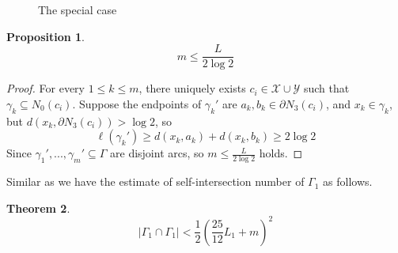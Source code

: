\documentclass[11pt, a4paper]{article}
\newtheorem{thm}{Theorem}[section]
\newtheorem{prop}[thm]{Proposition}
\theoremstyle{definition}
\theoremstyle{remark}
\newcommand{\calx}{\mathcal{X}}
\newcommand{\caly}{\mathcal{Y}}
\newcommand{\abs}[1]{\left| #1 \right|}
\newcommand{\bracket}[1]{\left( #1 \right)}
\begin{document}
\begin{enumerate}
\begin{figure}[htbp]

\caption{\label{fig:special_case}
The special case}
\end{figure}





\end{enumerate}









\begin{prop}
 $$m\leqslant\frac{L}{2\log2}$$
\end{prop}
\begin{proof}
For every $1\leqslant k\leqslant m$, there uniquely exists $c_i\in\calx\cup\caly$ such that $\gamma_k\subseteq N_0(c_i)$. Suppose the endpoints of $\gamma_k'$ are $a_k,b_k\in\partial N_3(c_i)$, and $x_k\in\gamma_k$, but $d(x_k,\partial N_3(c_i))>\log2$, so 
$$\ell(\gamma_k')\geqslant d(x_k,a_k)+d(x_k,b_k)\geqslant2\log2$$
Since $\gamma_1',...,\gamma_m'\subseteq\Gamma$ are disjoint arcs, so $m\leqslant\frac{L}{2\log2}$ holds.

\end{proof}






Similar as \cite[Theorem 3.3]{Y2800} we have the estimate of self-intersection number of $\Gamma_1$ as follows.

\begin{thm}
\begin{equation}\label{eqn:estimate_thick_part}
\abs{\Gamma_1\cap\Gamma_1}<\frac12\bracket{\frac{25}{12}L_1+m}^2
\end{equation}
\end{thm}
\end{document}
